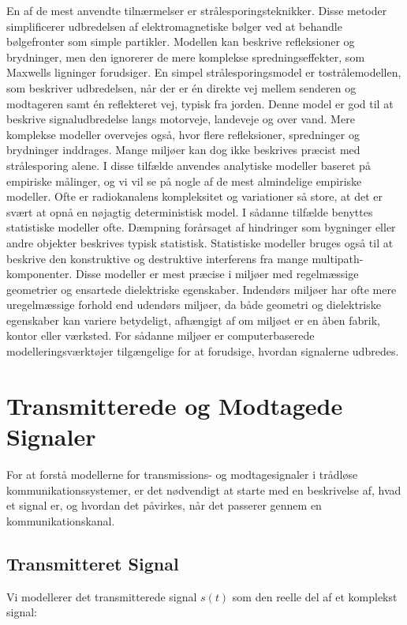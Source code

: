 \documentclass[a4paper,12pt]{book}
\begin{document}
	\newline\newline\noindent
	En af de mest anvendte tilnærmelser er strålesporingsteknikker. Disse metoder simplificerer udbredelsen af elektromagnetiske bølger ved at behandle bølgefronter som simple partikler. Modellen kan beskrive refleksioner og brydninger, men den ignorerer de mere komplekse spredningseffekter, som Maxwells ligninger forudsiger. En simpel strålesporingsmodel er tostrålemodellen, som beskriver udbredelsen, når der er én direkte vej mellem senderen og modtageren samt én reflekteret vej, typisk fra jorden. Denne model er god til at beskrive signaludbredelse langs motorveje, landeveje og over vand. Mere komplekse modeller overvejes også, hvor flere refleksioner, spredninger og brydninger inddrages. Mange miljøer kan dog ikke beskrives præcist med strålesporing alene. I disse tilfælde anvendes analytiske modeller baseret på empiriske målinger, og vi vil se på nogle af de mest almindelige empiriske modeller.
	\newline\newline\noindent
	Ofte er radiokanalens kompleksitet og variationer så store, at det er svært at opnå en nøjagtig deterministisk model. I sådanne tilfælde benyttes statistiske modeller ofte. Dæmpning forårsaget af hindringer som bygninger eller andre objekter beskrives typisk statistisk. Statistiske modeller bruges også til at beskrive den konstruktive og destruktive interferens fra mange multipath-komponenter. Disse modeller er mest præcise i miljøer med regelmæssige geometrier og ensartede dielektriske egenskaber. Indendørs miljøer har ofte mere uregelmæssige forhold end udendørs miljøer, da både geometri og dielektriske egenskaber kan variere betydeligt, afhængigt af om miljøet er en åben fabrik, kontor eller værksted. For sådanne miljøer er computerbaserede modelleringsværktøjer tilgængelige for at forudsige, hvordan signalerne udbredes.
	
	\section{Transmitterede og Modtagede Signaler}
	For at forstå modellerne for transmissions- og modtagesignaler i trådløse kommunikationssystemer, er det nødvendigt at starte med en beskrivelse af, hvad et signal er, og hvordan det påvirkes, når det passerer gennem en kommunikationskanal.
	
	\subsection{Transmitteret Signal}
	Vi modellerer det transmitterede signal \( s(t) \) som den reelle del af et komplekst signal:
	
\end{document}
